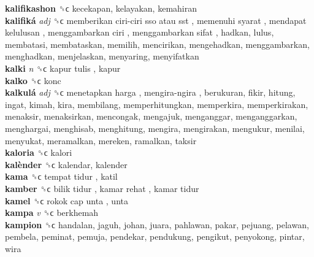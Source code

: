 \textbf{kalifikashon} ␝ϲ  kecekapan, kelayakan, kemahiran  \\
\textbf{kalifiká} \emph{adj}  ␝ϲ   memberikan ciri-ciri sso atau sst ,  memenuhi syarat ,  mendapat kelulusan ,  menggambarkan ciri ,  menggambarkan sifat , hadkan, lulus, membatasi, membataskan, memilih, mencirikan, mengehadkan, menggambarkan, menghadkan, menjelaskan, menyaring, menyifatkan  \\
\textbf{kalki} \emph{n}  ␝ϲ   kapur tulis , kapur  \\
\textbf{kalko} ␝ϲ  konc  \\
\textbf{kalkulá} \emph{adj}  ␝ϲ   menetapkan harga ,  mengira-ngira , berukuran, fikir, hitung, ingat, kimah, kira, membilang, memperhitungkan, memperkira, memperkirakan, menaksir, menaksirkan, mencongak, mengajuk, menganggar, menganggarkan, menghargai, menghisab, menghitung, mengira, mengirakan, mengukur, menilai, menyukat, meramalkan, mereken, ramalkan, taksir  \\
\textbf{kaloria} ␝ϲ  kalori  \\
\textbf{kalènder} ␝ϲ  kalendar, kalender  \\
\textbf{kama} ␝ϲ   tempat tidur , katil  \\
\textbf{kamber} ␝ϲ   bilik tidur ,  kamar rehat ,  kamar tidur   \\
\textbf{kamel} ␝ϲ   rokok cap unta , unta  \\
\textbf{kampa} \emph{v}  ␝ϲ  berkhemah  \\
\textbf{kampion} ␝ϲ  handalan, jaguh, johan, juara, pahlawan, pakar, pejuang, pelawan, pembela, peminat, pemuja, pendekar, pendukung, pengikut, penyokong, pintar, wira  \\
